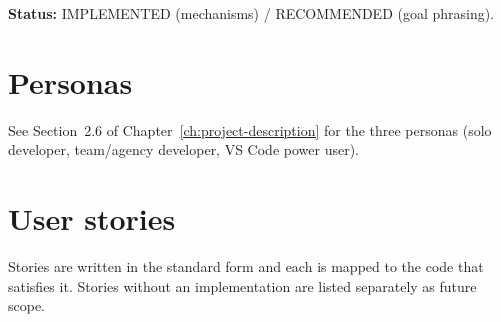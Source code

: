 \textbf{Status:} IMPLEMENTED (mechanisms) / RECOMMENDED (goal phrasing).

\section{Personas}

See Section~2.6 of Chapter~\ref{ch:project-description} for the three personas
(solo developer, team/agency developer, VS Code power user).

\section{User stories}

Stories are written in the standard form and each is mapped to the code that
satisfies it. Stories without an implementation are listed separately as future
scope.

